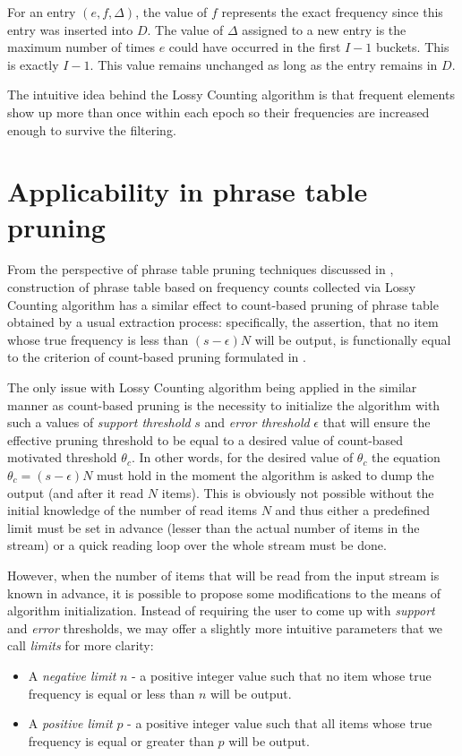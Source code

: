 For an entry $(e, f, \Delta)$, the value of $f$ represents the exact frequency
since this entry was inserted into $D$.
The value of $\Delta$ assigned to a new entry is the maximum number of times
$e$ could have occurred in the first $I-1$ buckets. This is exactly $I-1$.
This value remains unchanged as long as the entry remains in $D$.

The intuitive idea behind the Lossy Counting algorithm is that frequent elements
show up more than once within each epoch so their frequencies are increased enough
to survive the filtering.

\section{Applicability in phrase table pruning}

From the perspective of phrase table pruning techniques discussed in
, construction of phrase table based on frequency counts
collected via Lossy Counting algorithm has a similar effect to count-based pruning of
phrase table obtained by a usual extraction process:
specifically, the assertion, that no item whose true frequency is less than
$(s - \epsilon)N$ will be output, is functionally equal to the criterion of
count-based pruning formulated in .

The only issue with Lossy Counting algorithm being applied in the similar manner as
count-based pruning is the necessity to initialize the algorithm with such a values of
\emph{support threshold} $s$ and \emph{error threshold} $\epsilon$ that will ensure
the effective pruning threshold to be equal to a desired value of count-based
motivated threshold $\theta_{c}$.
In other words, for the desired value of $\theta_{c}$ the equation $\theta_{c} = (s - \epsilon)N$
must hold in the moment the algorithm is asked to dump the output (and after it read $N$ items).
This is obviously not possible without the initial knowledge of the number of read
items $N$ and thus either a predefined limit must be set in advance (lesser than
the actual number of items in the stream) or a quick reading loop over the whole stream
must be done.

However, when the number of items that will be read from the input stream is known
in advance, it is possible to propose some modifications to the means of algorithm
initialization.
Instead of requiring the user to come up with \emph{support} and \emph{error} thresholds,
we may offer a slightly more intuitive parameters that we call \emph{limits} for more clarity:
\begin{itemize}
  \item A \emph{negative limit} $n$ - a positive integer value such that no item
    whose true frequency is equal or less than $n$ will be output.
  \item A \emph{positive limit} $p$ - a positive integer value such that all items
    whose true frequency is equal or greater than $p$ will be output.
\end{itemize}

